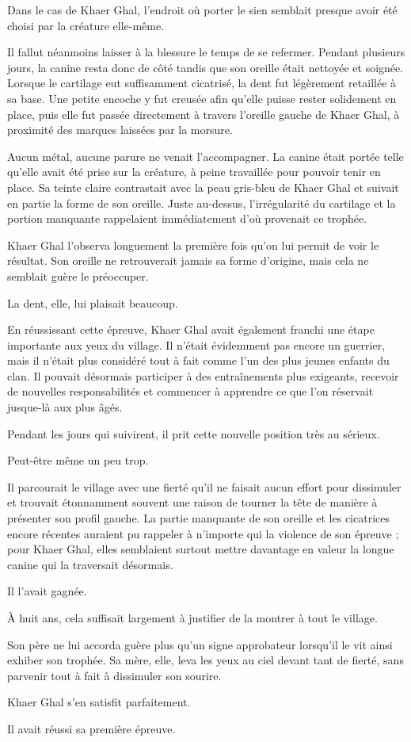 Dans le cas de Khaer Ghal, l'endroit où porter le sien semblait presque avoir
été choisi par la créature elle-même.

Il fallut néanmoins laisser à la blessure le temps de se refermer. Pendant
plusieurs jours, la canine resta donc de côté tandis que son oreille était
nettoyée et soignée. Lorsque le cartilage eut suffisamment cicatrisé, la dent
fut légèrement retaillée à sa base. Une petite encoche y fut creusée afin
qu'elle puisse rester solidement en place, puis elle fut passée directement
à travers l'oreille gauche de Khaer Ghal, à proximité des marques laissées par
la morsure.

Aucun métal, aucune parure ne venait l'accompagner. La canine était portée
telle qu'elle avait été prise sur la créature, à peine travaillée pour pouvoir
tenir en place. Sa teinte claire contrastait avec la peau gris-bleu de
Khaer Ghal et suivait en partie la forme de son oreille. Juste au-dessus,
l'irrégularité du cartilage et la portion manquante rappelaient immédiatement
d'où provenait ce trophée.

Khaer Ghal l'observa longuement la première fois qu'on lui permit de voir le
résultat. Son oreille ne retrouverait jamais sa forme d'origine, mais cela ne
semblait guère le préoccuper.

La dent, elle, lui plaisait beaucoup.

\scenebreak

En réussissant cette épreuve, Khaer Ghal avait également franchi une étape
importante aux yeux du village. Il n'était évidemment pas encore un guerrier,
mais il n'était plus considéré tout à fait comme l'un des plus jeunes enfants
du clan. Il pouvait désormais participer à des entraînements plus exigeants,
recevoir de nouvelles responsabilités et commencer à apprendre ce que l'on
réservait jusque-là aux plus âgés.

Pendant les jours qui suivirent, il prit cette nouvelle position très au
sérieux.

Peut-être même un peu trop.

Il parcourait le village avec une fierté qu'il ne faisait aucun effort pour
dissimuler et trouvait étonnamment souvent une raison de tourner la tête de
manière à présenter son profil gauche. La partie manquante de son oreille et
les cicatrices encore récentes auraient pu rappeler à n'importe qui la
violence de son épreuve ; pour Khaer Ghal, elles semblaient surtout mettre
davantage en valeur la longue canine qui la traversait désormais.

Il l'avait gagnée.

À huit ans, cela suffisait largement à justifier de la montrer à tout le
village.

Son père ne lui accorda guère plus qu'un signe approbateur lorsqu'il le vit
ainsi exhiber son trophée. Sa mère, elle, leva les yeux au ciel devant tant de
fierté, sans parvenir tout à fait à dissimuler son sourire.

Khaer Ghal s'en satisfit parfaitement.

Il avait réussi sa première épreuve.